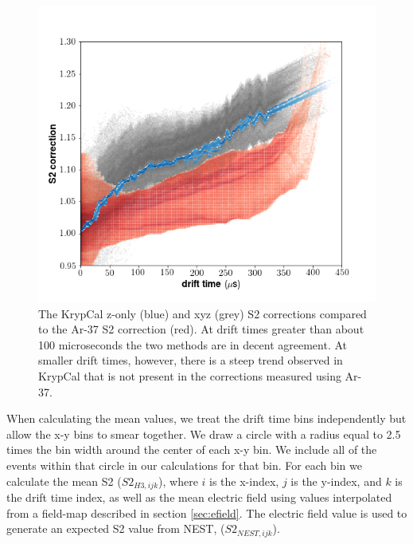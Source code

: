 \begin{figure}[h!]
\centering
\includegraphics[width=150mm]{Figures/S2corr_dt.png}
\caption{The KrypCal z-only (blue) and xyz (grey) S2 corrections compared to the Ar-37 S2 correction (red). At drift times greater than about 100 microseconds the two methods are in decent agreement. At smaller drift times, however, there is a steep trend observed in KrypCal that is not present in the corrections measured using Ar-37.}
\label{fig:S2corr_dt} 
\end{figure}
When calculating the mean values, we treat the drift time bins independently but allow the x-y bins to smear together. We draw a circle with a radius equal to 2.5 times the bin width around the center of each  x-y bin. We include all of the events within that circle in our calculations for that bin. For each bin we calculate the mean S2 ($S2_{H3,ijk}$), where $i$ is the x-index, $j$ is the y-index, and $k$ is the drift time index, as well as the mean electric field using values interpolated from a field-map described in section \ref{sec:efield}. The electric field value is used to generate an expected S2 value from NEST, ($S2_{NEST,ijk}$).

